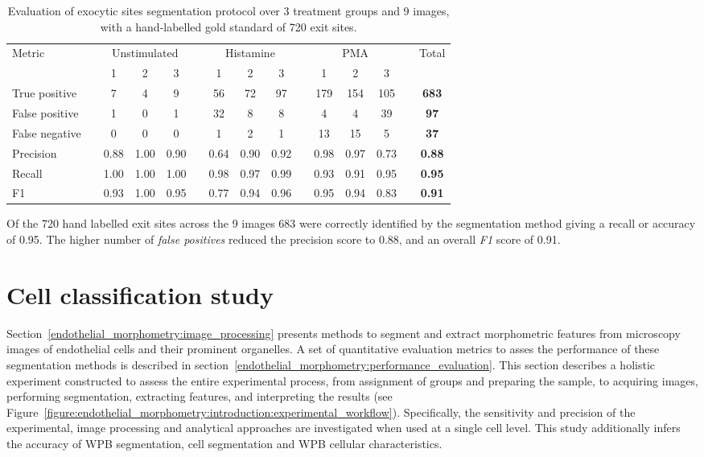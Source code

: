 \begin{table}[htbp!]
\footnotesize
\caption[Exocytic sites segmentation evaluation]{Evaluation of exocytic sites segmentation protocol over 3 treatment groups and 9 images, with a hand-labelled gold standard of 720 exit sites.}
\centering
\label{table:endothelial_morphometry:exocytic_sites_performance}
\begin{tabular}{l c c c c c c c c c c c c c >{\bfseries}c}
\toprule
\multirow{2}{*}{Metric} & & \multicolumn{3}{c}{Unstimulated} & & \multicolumn{3}{c}{Histamine} & & \multicolumn{3}{c}{PMA} & & \multirow{2}{*}{Total} \\
\cmidrule{3-5}
\cmidrule{7-9}
\cmidrule{11-13}
	& & 1 & 2 & 3 & & 1 & 2 & 3 & & 1 & 2 & 3 & &\\
\midrule
	True positive  & & 7 & 4 & 9 & & 56 & 72 & 97 & & 179 & 154 & 105 & & 683 \\
	False positive & & 1 & 0 & 1 & & 32 & 8  & 8  & & 4   & 4   & 39  & & 97  \\
	False negative & & 0 & 0 & 0 & & 1  & 2  & 1  & & 13  & 15  & 5   & & 37  \\
\midrule
	Precision      & & 0.88 & 1.00 & 0.90 & & 0.64 & 0.90 & 0.92 & & 0.98 & 0.97 & 0.73 & & 0.88 \\
	Recall         & & 1.00 & 1.00 & 1.00 & & 0.98 & 0.97 & 0.99 & & 0.93 & 0.91 & 0.95 & & 0.95 \\
	F1             & & 0.93 & 1.00 & 0.95 & & 0.77 & 0.94 & 0.96 & & 0.95 & 0.94 & 0.83 & & 0.91 \\
\bottomrule
\end{tabular}
\end{table}

Of the 720 hand labelled exit sites across the 9 images 683 were correctly identified by the segmentation method giving a recall or accuracy of 0.95. The higher number of \emph{false positives} reduced the precision score to 0.88, and an overall \emph{F1} score of 0.91.

\section{Cell classification study}
\label{endothelial_morphometry:cell_classification}
Section~\ref{endothelial_morphometry:image_processing} presents methods to segment and extract morphometric features from microscopy images of endothelial cells and their prominent organelles. A set of quantitative evaluation metrics to asses the performance of these segmentation methods is described in section~\ref{endothelial_morphometry:performance_evaluation}. This section describes a holistic experiment constructed to assess the entire experimental process, from assignment of groups and preparing the sample, to acquiring images, performing segmentation, extracting features, and interpreting the results (see Figure~\ref{figure:endothelial_morphometry:introduction:experimental_workflow}). Specifically, the sensitivity and precision of the experimental, image processing and analytical approaches are investigated when used at a single cell level. This study additionally infers the accuracy of WPB segmentation, cell segmentation and WPB cellular characteristics.

